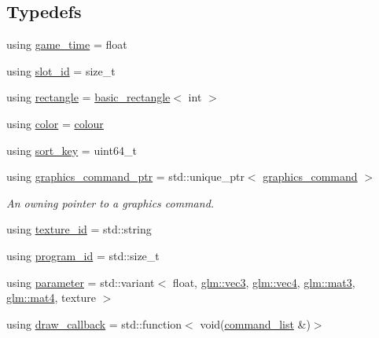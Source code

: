 \subsection*{Typedefs}
\begin{DoxyCompactItemize}
\item 
using \mbox{\hyperlink{namespacemoka_a4b8e94fbfa287169990f1cc8171c0984}{game\+\_\+time}} = float
\item 
using \mbox{\hyperlink{namespacemoka_a959d3112313fb589684e8b1e3df66385}{slot\+\_\+id}} = size\+\_\+t
\item 
using \mbox{\hyperlink{namespacemoka_ab5e90635f0a0441cc99f2328bc34500d}{rectangle}} = \mbox{\hyperlink{structmoka_1_1basic__rectangle}{basic\+\_\+rectangle}}$<$ int $>$
\item 
using \mbox{\hyperlink{namespacemoka_a8fbd522082ce6449bc1e307f785aafe5}{color}} = \mbox{\hyperlink{classmoka_1_1colour}{colour}}
\item 
using \mbox{\hyperlink{namespacemoka_afa30a616e67b83113ebdb857555cf2bb}{sort\+\_\+key}} = uint64\+\_\+t
\item 
using \mbox{\hyperlink{namespacemoka_a11189394b29b63aee831baa2166596db}{graphics\+\_\+command\+\_\+ptr}} = std\+::unique\+\_\+ptr$<$ \mbox{\hyperlink{classmoka_1_1graphics__command}{graphics\+\_\+command}} $>$
\begin{DoxyCompactList}\small\item\em An owning pointer to a graphics command. \end{DoxyCompactList}\item 
using \mbox{\hyperlink{namespacemoka_a562063640e8ad24ef94c1be0fd9079cf}{texture\+\_\+id}} = std\+::string
\item 
using \mbox{\hyperlink{namespacemoka_a2384dba7b6a57a9ae52567eefd6e177e}{program\+\_\+id}} = std\+::size\+\_\+t
\item 
using \mbox{\hyperlink{namespacemoka_afdb5f6e8afb209971d12dec045ec48ee}{parameter}} = std\+::variant$<$ float, \mbox{\hyperlink{namespacemoka_aed2224bc0e5b79e57a8975ded94ee1aaa97ade28e93c0de60adc075bdbe07ca36}{glm\+::vec3}}, \mbox{\hyperlink{namespacemoka_aed2224bc0e5b79e57a8975ded94ee1aaa1a9028fd802c481a99491a418ca2fe86}{glm\+::vec4}}, \mbox{\hyperlink{namespacemoka_aed2224bc0e5b79e57a8975ded94ee1aaa0dd87e9dfdea657e8be233b5836821d0}{glm\+::mat3}}, \mbox{\hyperlink{namespacemoka_aed2224bc0e5b79e57a8975ded94ee1aaabe14b41eb96410ea28b32bc138d885ae}{glm\+::mat4}}, texture $>$
\item 
using \mbox{\hyperlink{namespacemoka_a23ee9e48e7a7d5b76db8d678e34a53e7}{draw\+\_\+callback}} = std\+::function$<$ void(\mbox{\hyperlink{classmoka_1_1command__list}{command\+\_\+list}} \&)$>$
\end{DoxyCompactItemize}
